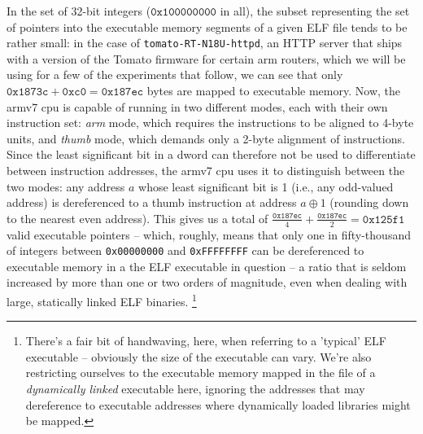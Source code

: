 \documentclass[12pt,glossary]{dalthesis}
\begin{document}
In the set of 32-bit integers (\(\texttt{0x100000000}\) in all), the subset representing
the set of pointers into the executable memory segments of a given ELF file
tends to be rather small: in the case of \texttt{tomato-RT-N18U-httpd}, an HTTP
server that ships with a version of the Tomato firmware for certain \gls{arm}
routers, which we will be using for a few of the experiments that follow,
we can see that only \(\texttt{0x1873c} + \texttt{0xc0} = \texttt{0x187ec}\) bytes are mapped to executable
memory. Now, the \gls{armv7} \gls{cpu} is capable of running in two different modes, each
with their own instruction set: \emph{arm} mode, which requires the instructions to
be aligned to 4-byte units, and \emph{thumb} mode, which demands only a 2-byte alignment
of instructions. Since the least significant bit in a dword can therefore not be
used to differentiate between instruction addresses, the \gls{armv7} \gls{cpu} uses it to
distinguish between the two modes: any address \(a\) whose least significant bit is 1
(i.e., any odd-valued address) is dereferenced to a thumb instruction
at address \(a \oplus 1\) (rounding down to the nearest even address). 
This gives us a total of \(\frac{\texttt{0x187ec}}{4} + \frac{\texttt{0x187ec}}{2} = \texttt{0x125f1}\) valid
executable pointers -- which, roughly, means that only one in fifty-thousand
of integers between \texttt{0x00000000} and \texttt{0xFFFFFFFF} can be dereferenced to executable
memory in a the ELF executable in question -- a ratio that is seldom increased
by more than one or two orders of magnitude, even when dealing with large,
statically linked ELF binaries.
  \footnote{There's a fair bit of handwaving, here, when referring to a 'typical' ELF 
  executable -- obviously the size of the executable can vary. We're also restricting
  ourselves to the executable memory mapped in the file of a \emph{dynamically linked}
  executable here, ignoring the addresses that may dereference to executable addresses
  where dynamically loaded libraries might be mapped.}
\end{document}
